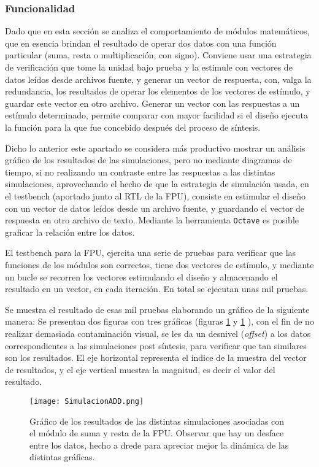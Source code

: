 \subsubsection{Funcionalidad}

Dado que en esta sección se analiza el comportamiento de módulos matemáticos, que en esencia brindan el resultado de operar dos datos con una función particular (suma, resta o multiplicación, con signo). Conviene usar una estrategia de verificación que tome la unidad bajo prueba y la estimule con vectores de datos leídos desde archivos fuente, y generar un vector de respuesta, con, valga la redundancia, los resultados de operar los elementos de los vectores de estímulo, y guardar este vector en otro archivo. Generar un vector con las respuestas a un estímulo determinado, permite comparar con mayor facilidad si el diseño ejecuta la función para la que fue concebido después del proceso de síntesis.

Dicho lo anterior este apartado se considera más productivo mostrar un análisis gráfico de los resultados de las simulaciones, pero no mediante diagramas de tiempo, si no realizando un contraste entre las respuestas a las distintas simulaciones, aprovechando el hecho de que la estrategia de simulación usada, en el testbench (aportado junto al RTL de la FPU), consiste en estimular el diseño con un vector de datos leídos desde un archivo fuente, y guardando el vector de respuesta en otro archivo de texto. Mediante la herramienta \texttt{Octave} es posible graficar la relación entre los datos.

El testbench para la FPU, ejercita una serie de pruebas para verificar que las funciones de los módulos son correctos, tiene dos vectores de estímulo, y mediante un bucle se recorren los vectores estimulando el diseño y almacenando el resultado en un vector, en cada iteración. En total se ejecutan unas mil pruebas.

Se muestra el resultado de esas mil pruebas elaborando un gráfico de la siguiente manera: Se presentan dos figuras con tres gráficas (figuras \ref{fig:sim_add} y \ref{fig:sim_add} ), con el fin de no realizar demasiada contaminación visual, se les da un desnivel (\textit{offset}) a los datos correspondientes a las simulaciones post síntesis, para verificar que tan similares son los resultados. El eje horizontal representa el índice de la muestra del vector de resultados, y el eje vertical muestra la magnitud, es decir el valor del resultado.

\begin{figure}[h]
\texttt{[image: SimulacionADD.png]}
\centering
\caption{Gráfico de los resultados de las distintas simulaciones asociadas con el módulo de suma y resta de la FPU. Observar que hay un desface entre los datos, hecho a drede para apreciar mejor la dinámica de las distintas gráficas.}
\label{fig:sim_add}
\end{figure}

